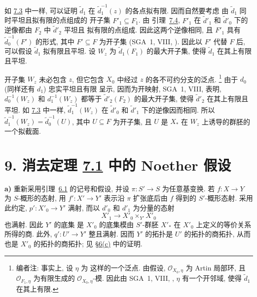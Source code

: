 如 \hyperref[lem:sga3-V-7.3]{7.3} 中一样, 可以证明
\(\widetilde d_1\) 在
\(\widetilde d_1^{-1}(z)\) 的各点拟有限. 因而自然要考虑
由 \(\widetilde d_1\) 同时平坦且拟有限的点组成的
开子集 \(F'_1\subseteq F_1\). 由
引理~\hyperref[lem:sga3-V-7.4]{7.4}, \(F'_1\) 在
\(\widetilde d'_1\) 和 \(\widetilde d'_0\) 下的逆像都由
\(F_2\) 中 \(\widetilde d'_2\) 平坦且
拟有限的点组成. 因此这两个逆像相同, 且 \(F'_1\) 具有
\(\widetilde d_0^{-1}(F')\) 的形式, 其中 \(F'\subseteq F\) 为开子集
(SGA~1, VIII, ). 因此以 \(F'\) 代替 \(F\) 后,
可以假设 \(\widetilde d_1\) 拟有限且平坦. 设 \(W_z\)
为 \(\widetilde d_1(F_1)\) 的最大开子集, 使得
\(\widetilde d_1\) 在其上有限且平坦.

开子集 \(W_z\) 未必包含 \(z\), 但它包含
\(X_0\) 中经过 \(z\) 的各不可约分支的泛点.%
\footnote{\label{note:sga3-V-45}编者注: 事实上, 设 \(\eta\) 为
这样的一个泛点. 由假设,
\(\mathcal O_{X_0,\eta}\) 为 Artin 局部环, 且
\(\mathcal O_{F_1,\eta}\) 为有限生成的
\(\mathcal O_{X_0,\eta}\)-模. 因此由 SGA~1, VIII, ,
\(\eta\) 有一个开邻域, 使得
\(\widetilde d_1\) 在其上有限.}
由于 \(d_0\) (同样还有 \(d_1\)) 忠实平坦且有限
呈示, 因而为开映射, SGA~1, VIII,  表明,
\(d_0^{-1}(W_z)\) 和 \(d_1^{-1}(W_z)\) 都等于
\(\widetilde d'_2(F_2)\) 的最大开子集, 使得
\(\widetilde d'_2\) 在其上有限且平坦. 如
\hyperref[lem:sga3-V-7.3]{7.3} 中一样,
\(\widetilde d_1^{-1}(W_z)\) 在 \(\widetilde d'_0\) 和
\(\widetilde d'_1\) 下的逆像因而相同. 所以
\(\widetilde d_1^{-1}(W_z)=\widetilde d_0^{-1}(U)\), 其中
\(U\subseteq F\) 为开子集, 且 \(U\) 是 \(X_\ast\)
在 \(W_z\) 上诱导的群胚的一个拟截面.

\section*{9. 消去定理 \hyperref[thm:sga3-V-7.1]{7.1} 中的 Noether 假设}
\label{sec:sga3-V-9}

\medskip
{}\label{par:sga3-V-9-a}%
\noindent\textbf{a)}\quad
重新采用引理~\hyperref[lem:sga3-V-6.1]{6.1}
的记号和假设, 并设
\(\pi:S'\to S\) 为任意基变换. 若 \(f:X\to Y\) 为
\(S\)-概形的态射, 用 \(f':X'\to Y'\) 表示沿
\(\pi\) 扩张底后由 \(f\) 得到的 \(S'\)-概形态射.
采用此约定, \(p':X'_0\to Y'\) 满射, 而以 \(d'_0\) 和 \(d'_1\)
为分量的态射
\[
  X'_1\longrightarrow X'_0\times_{Y'}X'_0
\]
也满射. 因此 \(Y'\) 的底集
是 \(X'_0\) 的底集模由 \(S'\)-群胚 \(X'_\ast\) 在 \(X'_0\)
上定义的等价关系所得的商.
此外, \(q':U'\to Y'\) 整且满射. 因而 \(Y'\)
的拓扑是 \(U'\) 的拓扑的商拓扑, 从而也是
\(X'_0\) 的拓扑的商拓扑; 见
\hyperref[par:sga3-V-6-c]{\S6(c)} 中的证明.

